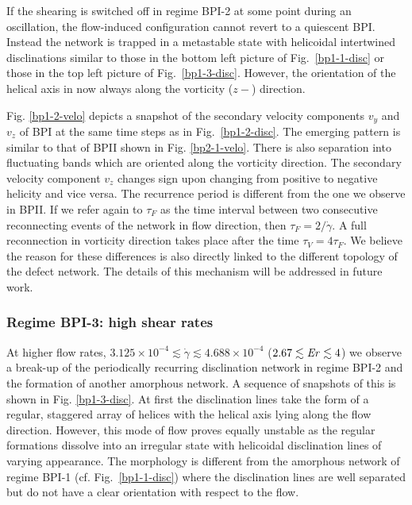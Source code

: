 \documentclass[8.5pt,twoside,twocolumn]{article}
\newcommand{\e}[1]{\times10^{#1}}
\newcommand{\gd}{\dot{\gamma}}
\begin{document}
If the shearing is switched off in
regime BPI-2 at some point during an oscillation, 
the flow-induced configuration cannot revert to a quiescent BPI.
Instead the network is trapped in a metastable state with 
helicoidal intertwined disclinations similar to those in the bottom left 
picture of Fig.~\ref{bp1-1-disc} or those in the top left picture of Fig.~\ref{bp1-3-disc}.
However, the orientation of the helical axis in now always 
along the vorticity ($z-$) direction.

Fig. \ref{bp1-2-velo} depicts a snapshot of the secondary velocity 
components $v_y$ and $v_z$ of BPI at the same time steps as in Fig.~\ref{bp1-2-disc}. 
The emerging pattern is similar to that of BPII shown in
Fig. \ref{bp2-1-velo}. 
There is also separation into fluctuating bands 
which are oriented along the vorticity direction.
The secondary velocity component $v_z$ changes sign upon
changing from positive to negative helicity and vice versa.
The recurrence period is different from the one we observe in BPII.
If we refer again to $\tau_F$ as the time interval between two consecutive 
reconnecting events of the network in flow direction, then $\tau_F=2/\gd$. 
A full reconnection in vorticity direction takes place after the time $\tau_V=4 \tau_F$.
We believe the reason for these differences is also directly linked to the different
topology of the defect network. The details of this mechanism will be
addressed in future work.

\subsubsection{Regime BPI-3: high shear rates }

At higher flow rates, $3.125\e{-4}\lesssim\gd\lesssim4.688\e{-4}$ 
($2.67\lesssim {\it Er}\lesssim 4$) we observe a break-up of the 
periodically recurring disclination network in regime BPI-2 and the formation
of another amorphous network. A sequence of snapshots of this is shown in Fig. \ref{bp1-3-disc}. 
At first the disclination lines take the form of a regular, staggered array of helices 
with the helical axis lying along the flow direction.
However, this mode of flow proves equally unstable as the regular formations dissolve into 
an irregular state with helicoidal disclination lines of varying 
appearance. The morphology is different from the amorphous network of
regime BPI-1 (cf. Fig.~\ref{bp1-1-disc}) where the disclination lines are 
well separated but do not have a clear orientation with respect to the flow. 
\end{document}
